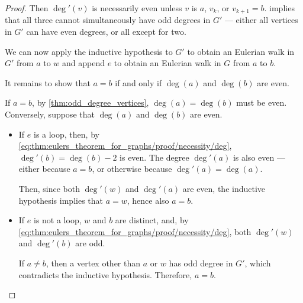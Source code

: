 \begin{proof}
  Then \( \deg'(v) \) is necessarily even unless \( v \) is \( a \), \( v_k \), or \( v_{k+1} = b \).  implies that all three cannot simultaneously have odd degrees in \( G' \) --- either all vertices in \( G' \) can have even degrees, or all except for two.

  We can now apply the inductive hypothesis to \( G' \) to obtain an Eulerian walk in \( G' \) from \( a \) to \( w \) and append \( e \) to obtain an Eulerian walk in \( G \) from \( a \) to \( b \).

  It remains to show that \( a = b \) if and only if \( \deg(a) \) and \( \deg(b) \) are even.

  If \( a = b \), by \cref{thm:odd_degree_vertices}, \( \deg(a) = \deg(b) \) must be even. Conversely, suppose that \( \deg(a) \) and \( \deg(b) \) are even.
  \begin{itemize}
    \item If \( e \) is a loop, then, by \eqref{eq:thm:eulers_theorem_for_graphs/proof/necessity/deg}, \( \deg'(b) = \deg(b) - 2 \) is even. The degree \( \deg'(a) \) is also even --- either because \( a = b \), or otherwise because \( \deg'(a) = \deg(a) \).

    Then, since both \( \deg'(w) \) and \( \deg'(a) \) are even, the inductive hypothesis implies that \( a = w \), hence also \( a = b \).

    \item If \( e \) is not a loop, \( w \) and \( b \) are distinct, and, by \eqref{eq:thm:eulers_theorem_for_graphs/proof/necessity/deg}, both \( \deg'(w) \) and \( \deg'(b) \) are odd.

    If \( a \neq b \), then a vertex other than \( a \) or \( w \) has odd degree in \( G' \), which contradicts the inductive hypothesis. Therefore, \( a = b \).
  \end{itemize}
\end{proof}
